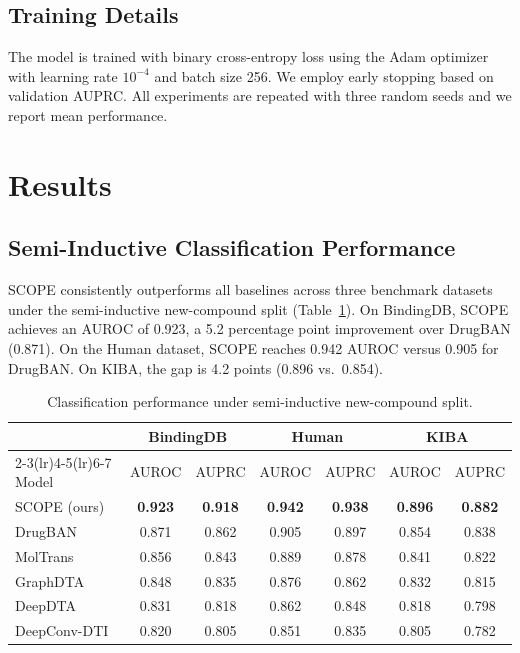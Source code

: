 \documentclass[11pt]{article}
\begin{document}
\subsection{Training Details}

The model is trained with binary cross-entropy loss using the Adam optimizer with learning rate $10^{-4}$ and batch size 256. We employ early stopping based on validation AUPRC. All experiments are repeated with three random seeds and we report mean performance.

\section{Results}

\subsection{Semi-Inductive Classification Performance}

SCOPE consistently outperforms all baselines across three benchmark datasets under the semi-inductive new-compound split (Table~\ref{tab:semind}). On BindingDB, SCOPE achieves an AUROC of 0.923, a 5.2 percentage point improvement over DrugBAN (0.871). On the Human dataset, SCOPE reaches 0.942 AUROC versus 0.905 for DrugBAN. On KIBA, the gap is 4.2 points (0.896 vs.\ 0.854).

\begin{table}[h]
\centering
\caption{Classification performance under semi-inductive new-compound split.}
\label{tab:semind}
\begin{tabular}{lcccccc}
\toprule
& \multicolumn{2}{c}{BindingDB} & \multicolumn{2}{c}{Human} & \multicolumn{2}{c}{KIBA} \\
\cmidrule(lr){2-3}\cmidrule(lr){4-5}\cmidrule(lr){6-7}
Model & AUROC & AUPRC & AUROC & AUPRC & AUROC & AUPRC \\
\midrule
SCOPE (ours) & \textbf{0.923} & \textbf{0.918} & \textbf{0.942} & \textbf{0.938} & \textbf{0.896} & \textbf{0.882} \\
DrugBAN & 0.871 & 0.862 & 0.905 & 0.897 & 0.854 & 0.838 \\
MolTrans & 0.856 & 0.843 & 0.889 & 0.878 & 0.841 & 0.822 \\
GraphDTA & 0.848 & 0.835 & 0.876 & 0.862 & 0.832 & 0.815 \\
DeepDTA & 0.831 & 0.818 & 0.862 & 0.848 & 0.818 & 0.798 \\
DeepConv-DTI & 0.820 & 0.805 & 0.851 & 0.835 & 0.805 & 0.782 \\
\bottomrule
\end{tabular}
\end{table}
\end{document}
